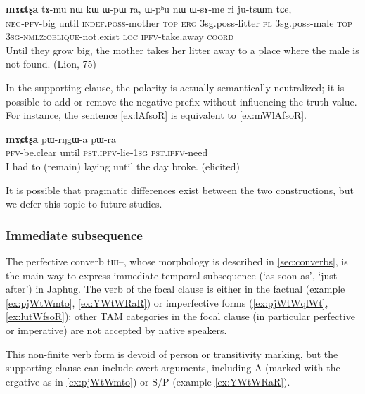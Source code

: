 \documentclass[oldfontcommands,oneside,a4paper,11pt]{article}
\newcommand{\ipa}[1]{{\phon \mbox{#1}}} %
\begin{document}
\begin{exe}
   \ex \label{ex:WsAme}
 \gll
[\ipa{mɯ-tʰɯ-wxti}]   	\textbf{\ipa{mɤɕtʂa}}  	\ipa{tɤ-mu}   	\ipa{nɯ}   	\ipa{kɯ}   	\ipa{ɯ-pɯ}   	\ipa{ra,}   	\ipa{ɯ-pʰu}   	\ipa{nɯ}   	\ipa{ɯ-sɤ-me}   	\ipa{ri}   	\ipa{ju-tsɯm}   	\ipa{tɕe,}   \\
\textsc{neg-pfv}-big until \textsc{indef.poss}-mother \textsc{top} \textsc{erg}  {3sg.poss}-litter \textsc{pl}  {3sg.poss}-male \textsc{top} \textsc{3sg-nmlz:oblique}-not.exist  \textsc{loc} \textsc{ipfv}-take.away \textsc{coord} \\
\glt  Until they grow big, the mother takes her litter away to a place where the male is not found. (Lion, 75)
  \end{exe}
  
In the supporting clause, the polarity is actually semantically neutralized; it is possible to add or remove the negative prefix without influencing the truth value. For instance, the sentence \ref{ex:lAfsoR} is equivalent to \ref{ex:mWlAfsoR}.

\begin{exe}
\ex \label{ex:lAfsoR}
\gll
[\ipa{lɤ-fsoʁ}]   	\textbf{\ipa{mɤɕtʂa}}   	\ipa{pɯ-rŋgɯ-a}   	\ipa{pɯ-ra}   \\
\textsc{pfv}-be.clear until \textsc{pst.ipfv}-lie-\textsc{1sg} \textsc{pst.ipfv}-need \\
\glt I had to (remain) laying until the day broke. (elicited)
\end{exe}

It is possible that pragmatic differences exist between the two constructions, but we defer this topic to future studies.

\subsubsection{Immediate subsequence}


The perfective converb \ipa{tɯ--},  whose morphology is described in \ref{sec:converbs}, is the main way to express immediate temporal subsequence  (`as soon as', `just after') in Japhug.   The verb of the focal clause is either in the factual (example \ref{ex:pjWtWmto}, \ref{ex:YWtWRaR}) or imperfective forms (\ref{ex:pjWtWqlWt}, \ref{ex:lutWfsoR}); other TAM categories in the focal clause (in particular perfective or imperative) are not accepted by native speakers.

This non-finite verb form is devoid of person or transitivity marking, but the supporting clause can include overt arguments, including A (marked with the ergative as in \ref{ex:pjWtWmto}) or S/P (example \ref{ex:YWtWRaR}). 
\end{document}
